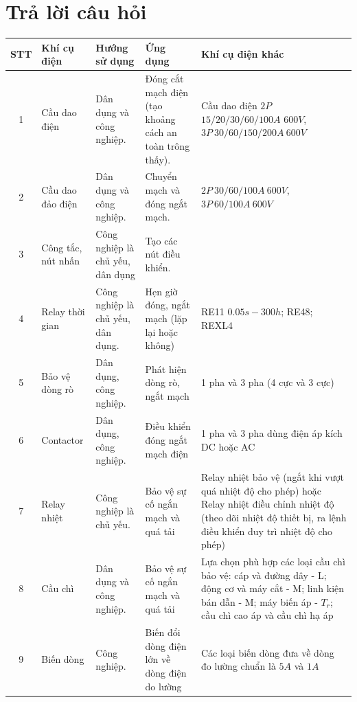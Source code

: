 \documentclass[13pt,a4paper]{extarticle}
\begin{document}
\section{Trả lời câu hỏi}
\begin{center}
\begin{tabular}{|c|p{1.7cm}|p{2cm}|p{5cm}|p{5cm}|}\hline
STT & Khí cụ điện & Hướng sử dụng & Ứng dụng & Khí cụ điện khác \\ \hline
1 & Cầu dao điện & Dân dụng và công nghiệp. & Đóng cắt mạch điện (tạo khoảng cách an toàn trông thấy). &  Cầu dao điện $2P$ $15/20/30/60/100A$ $600V$, $3P~30/60/150/200A ~ 600V$\\ \hline
2 & Cầu dao đảo điện & Dân dụng và công nghiệp. & Chuyển mạch và đóng ngắt mạch. & $2P~30/60/100A ~ 600V$, $3P~60/100A ~ 600V$\\ \hline
3 & Công tắc, nút nhấn & Công nghiệp là chủ yếu, dân dụng & Tạo các nút điều khiển. & \\ \hline
4 & Relay thời gian & Công nghiệp là chủ yếu, dân dụng. & Hẹn giờ đóng, ngắt mạch (lặp lại hoặc không) &  RE11 $0.05s-300h$; RE48; REXL4\\ \hline
5 & Bảo vệ dòng rò & Dân dụng, công nghiệp. & Phát hiện dòng rò, ngắt mạch &  1 pha và 3 pha (4 cực và 3 cực)\\ \hline
6 & Contactor & Dân dụng, công nghiệp. & Điều khiển đóng ngắt mạch điện &  1 pha và 3 pha dùng điện áp kích DC hoặc AC\\ \hline
7 & Relay nhiệt & Công nghiệp là chủ yếu. & Bảo vệ sự cố ngắn mạch và quá tải &  Relay nhiệt bảo vệ (ngắt khi vượt quá nhiệt độ cho phép) hoặc Relay nhiệt điều chỉnh nhiệt độ (theo dõi nhiệt độ thiết bị, ra lệnh điều khiển duy trì nhiệt độ cho phép)\\ \hline
8 & Cầu chì & Dân dụng và công nghiệp. & Bảo vệ sự cố ngắn mạch và quá tải &  Lựa chọn phù hợp các loại cầu chì bảo vệ: cáp và đường dây - L; động cơ và máy cắt - M; linh kiện bán dẫn - M; máy biến áp - $T_r$; cầu chì cao áp và cầu chì hạ áp\\ \hline
9 & Biến dòng & Công nghiệp. & Biến đổi dòng điện lớn về dòng điện do lường &  Các loại biến dòng đưa về dòng đo lường chuẩn là $5A$ và $1A$\\ \hline
\end{tabular}
\end{center}
\end{document}

